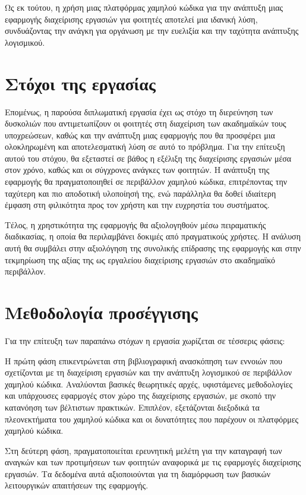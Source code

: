 		Ως εκ τούτου, η χρήση μιας πλατφόρμας χαμηλού κώδικα για την ανάπτυξη μιας εφαρμογής διαχείρισης εργασιών για φοιτητές αποτελεί μια ιδανική λύση, συνδυάζοντας την ανάγκη για οργάνωση με την ευελιξία και την ταχύτητα ανάπτυξης λογισμικού.


	\section{Στόχοι της εργασίας}
		Επομένως, η παρούσα διπλωματική εργασία έχει ως στόχο τη διερεύνηση των δυσκολιών που αντιμετωπίζουν οι φοιτητές στη διαχείριση των ακαδημαϊκών τους υποχρεώσεων, καθώς και την ανάπτυξη μιας εφαρμογής που θα προσφέρει μια ολοκληρωμένη και αποτελεσματική λύση σε αυτό το πρόβλημα. Για την επίτευξη αυτού του στόχου, θα εξεταστεί σε βάθος η εξέλιξη της διαχείρισης εργασιών μέσα στον χρόνο, καθώς και οι σύγχρονες ανάγκες των φοιτητών. Η ανάπτυξη της εφαρμογής θα πραγματοποιηθεί σε περιβάλλον χαμηλού κώδικα, επιτρέποντας την ταχύτερη και πιο αποδοτική υλοποίησή της, ενώ παράλληλα θα δοθεί ιδιαίτερη έμφαση στη φιλικότητα προς τον χρήστη και την ευχρηστία του συστήματος.

		Τέλος, η χρηστικότητα της εφαρμογής θα αξιολογηθούν μέσω πειραματικής διαδικασίας, η οποία θα περιλαμβάνει δοκιμές από πραγματικούς χρήστες. Η ανάλυση αυτή θα συμβάλει στην αξιολόγηση της συνολικής επίδρασης της εφαρμογής και στην τεκμηρίωση της αξίας της ως εργαλείου διαχείρισης εργασιών στο ακαδημαϊκό περιβάλλον.


	\section{Μεθοδολογία προσέγγισης}
		Για την επίτευξη των παραπάνω στόχων η εργασία χωρίζεται σε τέσσερις φάσεις:

		Η πρώτη φάση επικεντρώνεται στη βιβλιογραφική ανασκόπηση των εννοιών που σχετίζονται με τη διαχείριση εργασιών και την ανάπτυξη λογισμικού σε περιβάλλον χαμηλού κώδικα. Αναλύονται βασικές θεωρητικές αρχές, υφιστάμενες μεθοδολογίες και υπάρχουσες εφαρμογές στον χώρο της διαχείρισης εργασιών, με σκοπό την κατανόηση των βέλτιστων πρακτικών. Επιπλέον, εξετάζονται διεξοδικά τα πλεονεκτήματα του χαμηλού κώδικα και οι δυνατότητες που παρέχουν οι πλατφόρμες χαμηλού κώδικα.

		Στη δεύτερη φάση, πραγματοποιείται ερευνητική μελέτη για την καταγραφή των αναγκών και των προτιμήσεων των φοιτητών αναφορικά με τις εφαρμογές διαχείρισης εργασιών. Τα δεδομένα αυτά αξιοποιούνται για τη διαμόρφωση των βασικών λειτουργικών απαιτήσεων της εφαρμογής.

